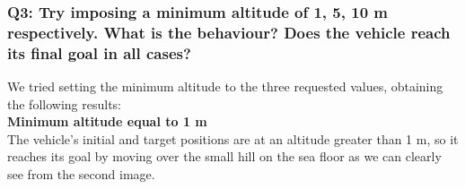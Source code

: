 \documentclass{article}
\begin{document}
\subsubsection{Q3: Try imposing a minimum altitude of 1, 5, 10 m respectively. What is the behaviour? Does the vehicle reach its final goal in all cases?}
We tried setting the minimum altitude to the three requested values, obtaining the following results: \\

{\large \textbf{Minimum altitude equal to 1 m}} \\
The vehicle's initial and target positions are at an altitude greater than 1 m, so it reaches its goal by moving over the small hill on the sea floor as we can clearly see from the second image.
\begin{figure}[H]
	\centering
	\hspace{10mm}
	\label{fig:ex1.2.3_case1m_ab}
\end{figure}
\end{document}
